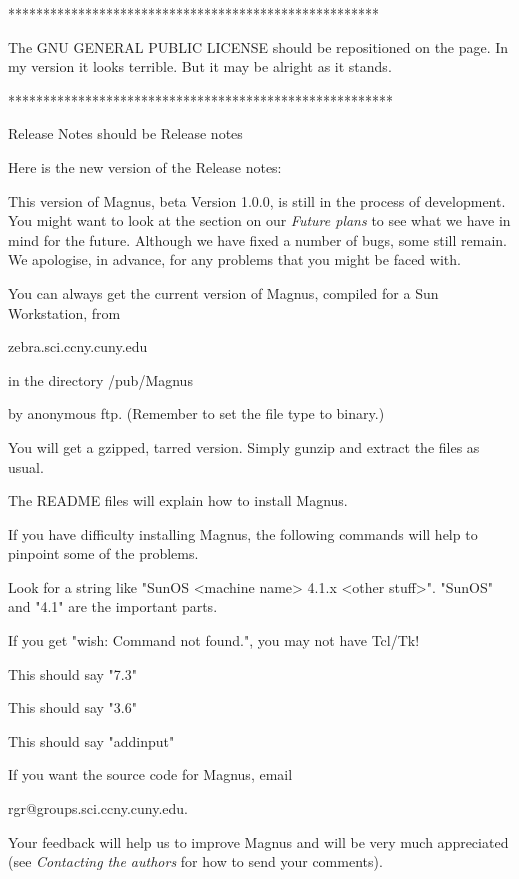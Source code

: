 *****************************************************

The GNU GENERAL PUBLIC LICENSE should be repositioned
on the page. In my version it looks terrible. But it
may be alright as it stands.

*******************************************************

Release Notes should be Release notes

Here is the new version of the Release notes:

This version of Magnus, beta Version 1.0.0, is still
in the process of development. You might want to look
at the section on our {\it Future plans} to see what we
have in mind for the future.  Although we have fixed
a number of bugs, some still remain. We apologise, in
advance, for any problems that you might be faced with.

You can always get the current version of Magnus, compiled for a Sun Workstation, from

zebra.sci.ccny.cuny.edu

in the directory  /pub/Magnus

by anonymous ftp. (Remember to set the file type to binary.)

You will get a gzipped, tarred version. Simply gunzip and extract
the files as usual.

The README files will explain how to install Magnus.

If you have difficulty installing Magnus, the following commands will help to pinpoint some of the problems.


Look for a string like "SunOS <machine name> 4.1.x <other stuff>". "SunOS" and "4.1" are the important parts.


If you get "wish: Command not found.", you may not have Tcl/Tk!

 
This should say "7.3"


This should say "3.6"


This should say "addinput"


If you want the source code for Magnus, email 

rgr@groups.sci.ccny.cuny.edu.

Your feedback will help us to improve Magnus and will
be very much appreciated (see {\it  Contacting the 
authors} for how to send your comments).









